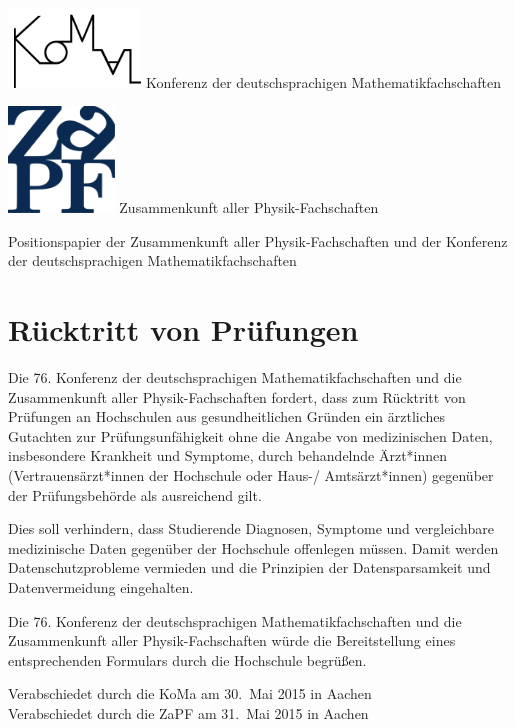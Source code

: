 \documentclass[DIV=calc]{scrartcl}
\begin{document}
\begin{minipage}{120pt}
\vspace{-2cm}
\includegraphics[width=100pt]{komaLogo.png}
\centering
\small Konferenz der deutschsprachigen Mathematikfachschaften
\end{minipage}
\hfill
\begin{minipage}{120pt}
\vspace{-2cm}
\includegraphics[width=80pt]{zapf_logo.pdf}
\centering
\small Zusammenkunft aller Physik-Fachschaften
\end{minipage}
\begin{center}
\huge{Positionspapier der Zusammenkunft aller Physik-Fachschaften und der Konferenz der deutschsprachigen Mathematikfachschaften} \\
\normalsize
\end{center}

\section*{Rücktritt von Prüfungen}

Die 76. Konferenz der deutschsprachigen Mathematikfachschaften
und die Zusammenkunft aller Physik-Fachschaften
fordert, dass zum Rücktritt von Prüfungen an Hochschulen aus
gesundheitlichen Gründen ein ärztliches Gutachten zur
Prüfungsunfähigkeit ohne die Angabe von medizinischen Daten,
insbesondere Krankheit und Symptome, durch behandelnde Ärzt*innen
(Vertrauensärzt*innen der Hochschule oder Haus-/ Amtsärzt*innen)
gegenüber der Prüfungsbehörde als ausreichend gilt.

Dies soll verhindern, dass Studierende Diagnosen, Symptome und
vergleichbare medizinische Daten gegenüber der Hochschule offenlegen
müssen. Damit werden Datenschutzprobleme vermieden und die Prinzipien
der Datensparsamkeit und Datenvermeidung eingehalten.

Die 76. Konferenz der deutschsprachigen Mathematikfachschaften und
die Zusammenkunft aller Physik-Fachschaften würde
die Bereitstellung eines entsprechenden Formulars durch die Hochschule
begrüßen.

\vfill
\begin{flushright}
Verabschiedet durch die KoMa am 30.~Mai 2015 in Aachen\\
Verabschiedet durch die ZaPF am 31.~Mai 2015 in Aachen
\end{flushright}
\end{document}
